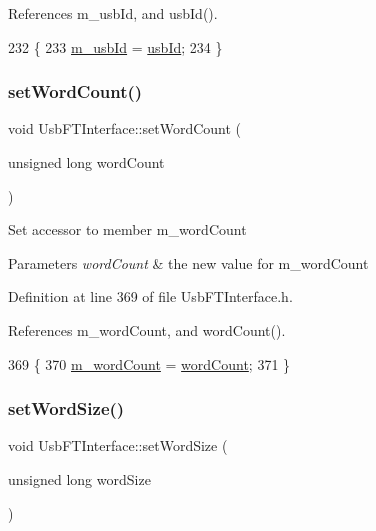 References m\+\_\+usb\+Id, and usb\+Id().


\begin{DoxyCode}
232                             \{
233     \hyperlink{classUsbFTInterface_a91df5c0547e8be460bc087e27afe05aa}{m\_usbId} = \hyperlink{classUsbFTInterface_a2a63b462eb5831b4aef9d0f4c8d6ee1a}{usbId};
234   \}
\end{DoxyCode}
\mbox{\label{classUsbFTInterface_a8251b4faa76c380ea41d795482532e30}} 
\subsubsection{\texorpdfstring{set\+Word\+Count()}{setWordCount()}}
{\footnotesize\ttfamily void Usb\+F\+T\+Interface\+::set\+Word\+Count (\begin{DoxyParamCaption}\item[{unsigned long}]{word\+Count }\end{DoxyParamCaption})\hspace{0.3cm}{\ttfamily [inline]}}

Set accessor to member m\+\_\+word\+Count 
\begin{DoxyParams}{Parameters}
{\em word\+Count} & the new value for m\+\_\+word\+Count \\
\hline
\end{DoxyParams}


Definition at line 369 of file Usb\+F\+T\+Interface.\+h.



References m\+\_\+word\+Count, and word\+Count().


\begin{DoxyCode}
369                                               \{
370     \hyperlink{classUsbFTInterface_a91c81850db2579afa6a5296e0bf0dbef}{m\_wordCount} = \hyperlink{classUsbFTInterface_a2acaf55e8c253f20e1f25a023c9238f4}{wordCount};
371   \}
\end{DoxyCode}
\mbox{\label{classUsbFTInterface_a1666f09d2b8994f8d13d6bc66f43b530}} 
\subsubsection{\texorpdfstring{set\+Word\+Size()}{setWordSize()}}
{\footnotesize\ttfamily void Usb\+F\+T\+Interface\+::set\+Word\+Size (\begin{DoxyParamCaption}\item[{unsigned long}]{word\+Size }\end{DoxyParamCaption})\hspace{0.3cm}{\ttfamily [inline]}}


